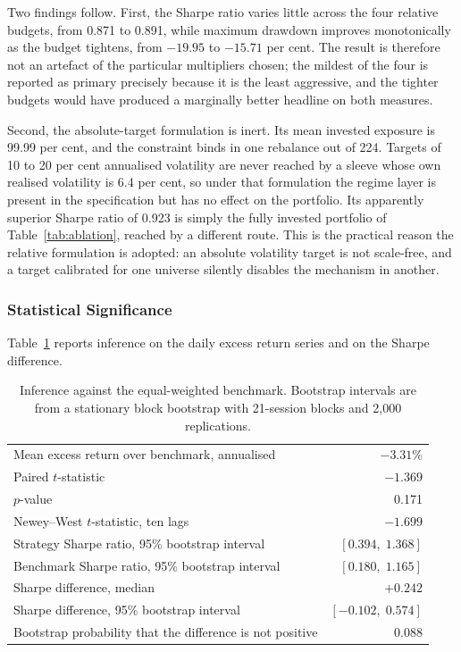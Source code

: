 Two findings follow. First, the Sharpe ratio varies little across the four relative
budgets, from 0.871 to 0.891, while maximum drawdown improves monotonically as the budget
tightens, from $-19.95$ to $-15.71$ per cent. The result is therefore not an artefact of
the particular multipliers chosen; the mildest of the four is reported as primary
precisely because it is the least aggressive, and the tighter budgets would have produced
a marginally better headline on both measures.

Second, the absolute-target formulation is inert. Its mean invested exposure is 99.99 per
cent, and the constraint binds in one rebalance out of 224. Targets of 10 to 20 per cent
annualised volatility are never reached by a sleeve whose own realised volatility is 6.4
per cent, so under that formulation the regime layer is present in the specification but
has no effect on the portfolio. Its apparently superior Sharpe ratio of 0.923 is simply
the fully invested portfolio of Table~\ref{tab:ablation}, reached by a different route.
This is the practical reason the relative formulation is adopted: an absolute volatility
target is not scale-free, and a target calibrated for one universe silently disables the
mechanism in another.

\subsubsection{Statistical Significance}

Table~\ref{tab:inference} reports inference on the daily excess return series and on the
Sharpe difference.

\begin{table}[!ht]
\centering
\caption{Inference against the equal-weighted benchmark. Bootstrap intervals are from a
stationary block bootstrap with 21-session blocks and 2{,}000 replications.}
\label{tab:inference}
\footnotesize
\begin{tabular}{p{6.4cm}r}
\hline
Mean excess return over benchmark, annualised & $-3.31$\% \\
Paired $t$-statistic & $-1.369$ \\
$p$-value & 0.171 \\
Newey--West $t$-statistic, ten lags & $-1.699$ \\
\hline
Strategy Sharpe ratio, 95\% bootstrap interval & $[0.394, \; 1.368]$ \\
Benchmark Sharpe ratio, 95\% bootstrap interval & $[0.180, \; 1.165]$ \\
Sharpe difference, median & $+0.242$ \\
Sharpe difference, 95\% bootstrap interval & $[-0.102, \; 0.574]$ \\
Bootstrap probability that the difference is not positive & 0.088 \\
\hline
\end{tabular}
\end{table}

